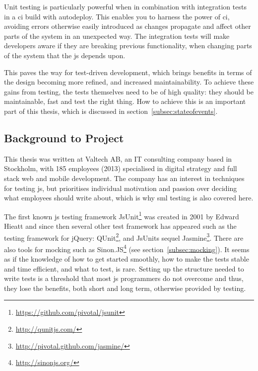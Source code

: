\documentclass[11pt]{article}
\begin{document}
Unit testing is particularly powerful when in combination with integration tests in a \gls{ci} build with \gls{autodeploy}.
This enables you to harness the power of \gls{ci}, avoiding errors otherwise easily introduced as changes propagate and affect other parts of the system in an unexpected way. The integration tests will make developers aware if they are breaking previous functionality, when changing parts of the system that the \gls{js} depends upon.

This paves the way for test-driven development, which brings benefits in terms of the design becoming more refined, and increased maintainability. To achieve these gains from testing, the tests themselves need to be of high quality: they should be maintainable, fast and test the right thing. How to achieve this is an important part of this thesis, which is discussed in section~\ref{subsec:stateofevents}.

\subsection{Background to Project}
\label{mltestingframeworks}

This thesis was written at Valtech AB, an IT consulting company based in Stockholm, with 185 employees (2013) specialised in digital strategy and full stack web and mobile development. The company has an interest in techniques for testing \gls{js}, but prioritises individual motivation and passion over deciding what employees should write about, which is why \gls{sml} testing is also covered here.

The first known \gls{js} testing framework JsUnit\footnote{\url{https://github.com/pivotal/jsunit}} was created in 2001 by Edward Hieatt \cite{GoingFaster} and since then several other test framework has appeared such as the testing framework for jQuery: QUnit\footnote{\url{http://qunitjs.com/}}, and JsUnits sequel Jasmine\footnote{\url{http://pivotal.github.com/jasmine/}}. There are also tools for mocking such as Sinon.JS\footnote{\url{http://sinonjs.org/}} (see section~\ref{subsec:mocking}). It seems as if the knowledge of how to get started smoothly, how to make the tests stable and time efficient, and what to test, is rare. Setting up the structure needed to write tests is a threshold that most \gls{js} programmers do not overcome \cite{TestingStatistics} and thus, they lose the benefits, both short and long term, otherwise provided by testing.
\end{document}
